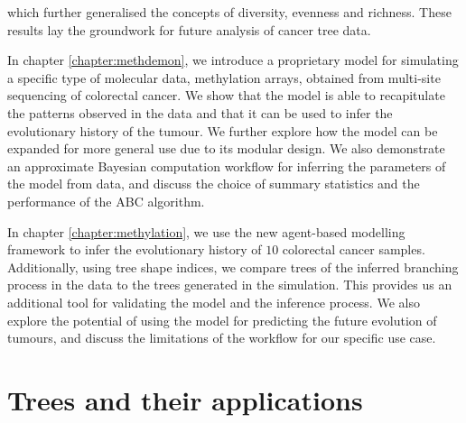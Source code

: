 which further generalised the concepts of diversity, evenness and richness. These results lay the groundwork for
future analysis of cancer tree data.\par
In chapter \ref{chapter:methdemon}, we introduce a proprietary model for simulating a specific type of molecular data, methylation arrays, obtained from
multi-site sequencing of colorectal cancer. We show that the model is able to recapitulate the patterns observed in the
data and that it can be used to infer the evolutionary history of the tumour. We further explore how the model can be expanded
for more general use due to its modular design. We also demonstrate an approximate Bayesian computation workflow for inferring
the parameters of the model from data, and discuss the choice of summary statistics and the performance of the ABC algorithm.\par
In chapter \ref{chapter:methylation}, we use the new agent-based modelling framework to infer the evolutionary history of
$10$ colorectal cancer samples. Additionally, using tree shape indices, we compare trees of the inferred branching process in the data to the trees
generated in the simulation. This provides us an additional tool for validating the model and the inference process. We also
explore the potential of using the model for predicting the future evolution of tumours, and discuss the limitations of the
workflow for our specific use case.\par


\section{Trees and their applications}

